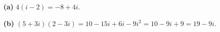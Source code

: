 \textbf{(a)} $4(i-2)=\boxed{-8+4i}$.

\textbf{(b)} $(5+3i)(2-3i)=10-15i+6i-9i^2=10-9i+9=\boxed{19-9i}$.
